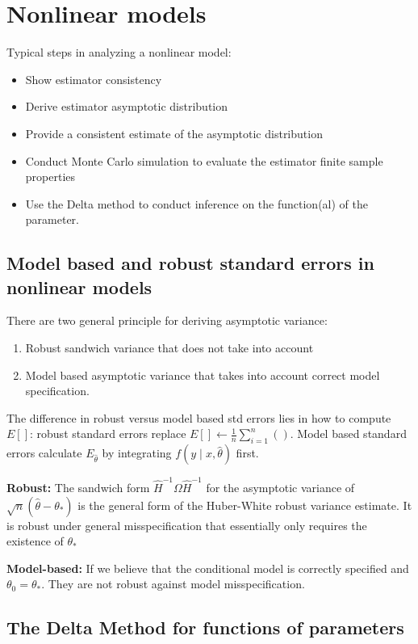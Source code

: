 \documentclass{article}
\begin{document}
\section{Nonlinear models}
Typical steps in analyzing a nonlinear model:
\begin{itemize}
  \item Show estimator consistency
  \item Derive estimator asymptotic distribution
  \item Provide a consistent estimate of the asymptotic distribution
  \item Conduct Monte Carlo simulation to evaluate the estimator finite sample properties
  \item Use the Delta method to conduct inference on the function(al) of the parameter.
\end{itemize}

\subsection{Model based and robust standard errors in nonlinear models}
There are two general principle for deriving asymptotic variance:
\begin{enumerate}
  \item Robust sandwich variance that does not take into account
  \item Model based asymptotic variance that takes into account correct model specification.
\end{enumerate}

The difference in robust versus model based std errors lies in how to compute $E[]$: robust standard errors replace $E[] \leftarrow \frac{1}{n}\sum_{i=1}^n ()$. Model based standard errors calculate $E_{\hat{\theta}}$ by integrating $f(y \mid x, \hat{\theta})$ first.

\textbf{Robust:} The sandwich form $\hat{H}^{-1}\Omega\hat{H}^{-1}$ for the asymptotic variance of $\sqrt{n}(\hat{\theta} - \theta_*)$ is the general form of the Huber-White robust variance estimate. It is robust under general misspecification that essentially only requires the existence of $\theta_*$

\textbf{Model-based:} If we believe that the conditional model is correctly specified and $\theta_0 = \theta_*$. They are not robust against model misspecification.


\subsection{The Delta Method for functions of parameters}
\end{document}
